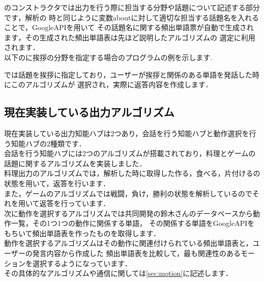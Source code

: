 のコンストラクタでは出力を行う際に担当する分野や話題について記述する部分です，解析の
時と同じように変数aboutに対して適切な担当する話題名を入れることで，GoogleAPIを用いて
その話題名に関する頻出単語票が自動で生成されます，その生成された頻出単語表は先ほど説明したアルゴリズムの
選定に利用されます．\\

以下のに挨拶の分野を指定する場合のプログラムの例を示します. \\


では話題を挨拶に指定しており，ユーザーが挨拶と関係のある単語を発話した時にこのアルゴリズムが
選択され，実際に返答内容を作成します．\\

\subsection{現在実装している出力アルゴリズム}\label{sec:back}
現在実装している出力知能ハブは2つあり，会話を行う知能ハブと動作選択を行う知能ハブの2種類です．\\

会話を行う知能ハブには2つのアルゴリズムが搭載されており，料理とゲームの話題に関するアルゴリズムを実装しました．\\

料理出力のアルゴリズムでは，解析した時に取得した作る，食べる，片付けるの状態を用いて，返答を行います．
\\
また，ゲームのアルゴリズムでは戦闘，負け，勝利の状態を解析しているのでそれを用いて返答を行っています．
\\

次に動作を選択するアルゴリズムでは共同開発の鈴木さんのデータベースから動作一覧，その1つ1つの動作に関係する単語，
その関係する単語をGoogleAPIをもちいて頻出単語表を作ったものを取得します．\\

動作を選択するアルゴリズムはその動作に関連付けられている頻出単語表と，ユーザーの発言内容から作成した
頻出単語表を比較して，最も関連性のあるモーションを選択するようになっています．\\

その具体的なアルゴリズムや通信に関しては\ref{sec:motion}に記述します．\\






